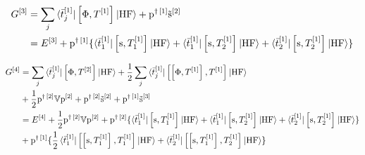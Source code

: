 \begin{equation}\label{eq:third-order-G}
  \begin{aligned}
    G^{[3]} &= \sum_j\braket{\bar{t}_{j}^{[1]} | \left[ \Phi, T^{[1]} \right]^{} |
    \mathrm{HF}} + \mathrm{p}^{\dagger\, [1]}\tilde{\mathrm{s}}^{[2]} \\
    &= E^{[3]}
    + \mathrm{p}^{\dagger\, [1]}
    \lbrace
      \braket{\bar{t}_{1}^{[1]} | \left[ \mathrm{s}, T^{[1]}_1 \right]^{} | \mathrm{HF}}
    + \braket{\bar{t}_{1}^{[1]} | \left[ \mathrm{s}, T^{[1]}_2 \right]^{} | \mathrm{HF}}
    + \braket{\bar{t}_{2}^{[1]} | \left[ \mathrm{s}, T^{[1]}_2 \right]^{} | \mathrm{HF}}
    \rbrace
  \end{aligned}
\end{equation}

\begin{equation}\label{eq:fourth-order-G}
  \begin{aligned}
    G^{[4]} &= \sum_j\braket{\bar{t}_{j}^{[1]} | \left[ \Phi, T^{[2]} \right]^{} |
    \mathrm{HF}} +
    \frac{1}{2}\sum_j\braket{\bar{t}_{j}^{[1]} |
    \left[ \left[ \Phi, T^{[1]} \right]^{}, T^{[1]} \right]^{} |
    \mathrm{HF}} \\
    &+\frac{1}{2}\mathrm{p}^{\dagger\,[2]}\mathbb{V}\mathrm{p}^{[2]}
    + \mathrm{p}^{\dagger\,[2]}\tilde{\mathrm{s}}^{[2]}
    + \mathrm{p}^{\dagger\,[1]}\tilde{\mathrm{s}}^{[3]} \\
    &= E^{[4]} + \frac{1}{2}\mathrm{p}^{\dagger\,[2]}\mathbb{V}\mathrm{p}^{[2]}
    +\mathrm{p}^{\dagger\,[2]}
    \lbrace
      \braket{\bar{t}_{1}^{[1]} | \left[ \mathrm{s}, T^{[1]}_1 \right]^{} | \mathrm{HF}}
    + \braket{\bar{t}_{1}^{[1]} | \left[ \mathrm{s}, T^{[1]}_2 \right]^{} | \mathrm{HF}}
    + \braket{\bar{t}_{2}^{[1]} | \left[ \mathrm{s}, T^{[1]}_2 \right]^{} | \mathrm{HF}}
    \rbrace \\
    &+\mathrm{p}^{\dagger\,[1]}
    \lbrace
    \frac{1}{2}\braket{\bar{t}_{1}^{[1]} |
    \left[ \left[ \mathrm{s}, T^{[1]}_1 \right]^{}, T^{[1]}_1 \right]^{}
    |
    \mathrm{HF}}
    + \braket{\bar{t}_{2}^{[1]} |
    \left[ \left[ \mathrm{s}, T^{[1]}_1 \right]^{}, T^{[1]}_2 \right]^{}
    |
    \mathrm{HF}}
    \rbrace
  \end{aligned}
\end{equation}

